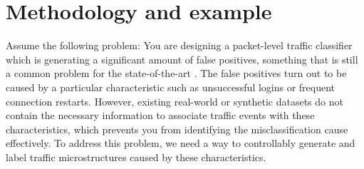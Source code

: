 \documentclass[runningheads]{llncs}
\begin{document}



\section{Methodology and example}\label{Sec:Motivation}






Assume the following problem: You are designing a packet-level traffic classifier which is generating a significant amount of false positives, something that is still a common problem for the state-of-the-art \cite{nisioti2018intrusion}. The false positives turn out to be caused by a particular characteristic such as unsuccessful logins or frequent connection restarts. However, existing real-world or synthetic datasets do not contain the necessary information to associate traffic events with these characteristics, which prevents you from identifying the misclassification cause effectively. To address this problem, we need a way to controllably generate and label traffic microstructures caused by these characteristics.
\end{document}

